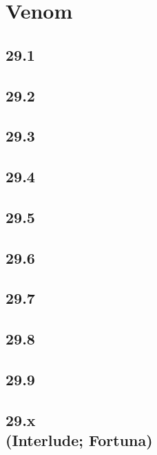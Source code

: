 \part{Venom}

 \chapter{29.1}

 \chapter{29.2}

 \chapter{29.3}

 \chapter{29.4}

 \chapter{29.5}

 \chapter{29.6}

 \chapter{29.7}

 \chapter{29.8}

 \chapter{29.9}

 \chapter[29.x (Interlude; Fortuna)]{29.x\\(Interlude; Fortuna)}











